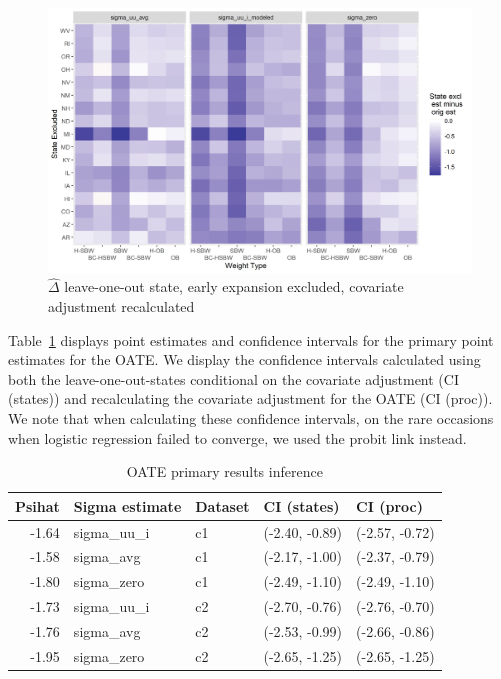 \documentclass[12pt]{article}
\begin{document}
\begin{figure}[]
\begin{center}
    \includegraphics[scale=0.6]{01_Plots/loostate-repub-sensitivityc2-proc-full.png}
    \caption{$\hat{\Delta}$ leave-one-out state, early expansion excluded, covariate adjustment recalculated}
    \label{fig:rdiffc2proc}
\end{center}
\end{figure}

Table~\ref{tab:oateconfint} displays point estimates and confidence intervals for the primary point estimates for the OATE. We display the confidence intervals calculated using both the leave-one-out-states conditional on the covariate adjustment (CI (states)) and recalculating the covariate adjustment for the OATE (CI (proc)). We note that when calculating these confidence intervals, on the rare occasions when logistic regression failed to converge, we used the probit link instead.

\begin{table}[ht]
\centering
\begin{tabular}{rllll}
  \toprule
Psihat & Sigma estimate & Dataset & CI (states) & CI (proc) \\ 
  \midrule
-1.64 & sigma\_uu\_i & c1 & (-2.40, -0.89) & (-2.57, -0.72) \\ 
  -1.58 & sigma\_avg & c1 & (-2.17, -1.00) & (-2.37, -0.79) \\ 
  -1.80 & sigma\_zero & c1 & (-2.49, -1.10) & (-2.49, -1.10) \\ 
  -1.73 & sigma\_uu\_i & c2 & (-2.70, -0.76) & (-2.76, -0.70) \\ 
  -1.76 & sigma\_avg & c2 & (-2.53, -0.99) & (-2.66, -0.86) \\ 
  -1.95 & sigma\_zero & c2 & (-2.65, -1.25) & (-2.65, -1.25) \\ 
   \bottomrule
\end{tabular}
\caption{OATE primary results inference}
\label{tab:oateconfint}
\end{table}
\end{document}
